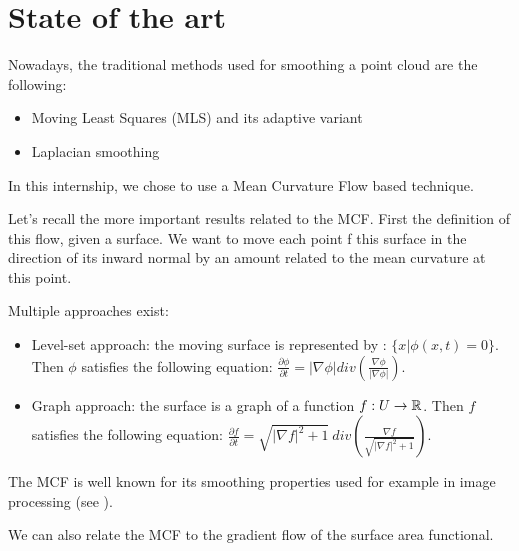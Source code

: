 \chapter{State of the art}


Nowadays, the traditional methods used for smoothing a point cloud are the
following:
\begin{itemize}
    \item Moving Least Squares (MLS) and its adaptive variant
    \item Laplacian smoothing
\end{itemize}

In this internship, we chose to use a Mean Curvature Flow based technique.

Let's recall the more important results related to the MCF.
First the definition of this flow, given a surface. We want to move each point f
this surface in the direction of its inward normal by an amount related to the
mean curvature at this point.

Multiple approaches exist:
\begin{itemize}
    \item Level-set approach: the moving surface is represented by : $ \{ x |
        \phi(x, t) = 0 \} $. Then $ \phi $ satisfies the following equation: $
        \frac{\partial \phi}{\partial t} = |\nabla \phi| div(\frac{\nabla
            \phi}{| \nabla \phi |}) $.
    \item Graph approach: the surface is a graph of a function $ f : U
        \rightarrow \mathbb{R} $. Then $ f $ satisfies the following equation: $
        \frac{\partial f}{\partial t} = \sqrt{|\nabla f|^2 + 1} ~div(\frac{\nabla
        f}{\sqrt{|\nabla f|^2 + 1}}) $.
\end{itemize}

The MCF is well known for its smoothing properties used for example in image
processing (see \cite{ciomaga2010level}).

We can also relate the MCF to the gradient flow of the surface area functional.

